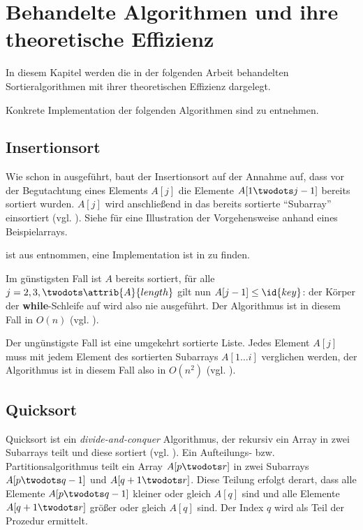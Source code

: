 \chapter{Behandelte Algorithmen und ihre theoretische Effizienz}
\label{cha:algorithmen}

In diesem Kapitel werden die in der folgenden Arbeit behandelten Sortieralgorithmen mit ihrer theoretischen Effizienz dargelegt.

Konkrete Implementation der folgenden Algorithmen sind  zu entnehmen.

\section{Insertionsort}
\label{sec:alg-insertion}

Wie schon in  ausgeführt, baut der Insertionsort auf der Annahme auf, dass vor der Begutachtung eines Elements $A[j]$ die Elemente $A[1 \twodots j - 1]$ bereits sortiert wurden. $A[j]$ wird anschließend in das bereits sortierte \enquote{Subarray} einsortiert (vgl. \cite[80]{taocp3}). Siehe  für eine Illustration der Vorgehensweise anhand eines Beispielarrays.





 ist aus \cite[18]{clrs2001} entnommen, eine Implementation ist in  zu finden.

Im günstigsten Fall ist $A$ bereits sortiert, für alle $j = 2, 3, \twodots \attrib{A}{length}$ gilt nun $A[j - 1] \leq \id{key}$: der Körper der \textbf{while}-Schleife auf  wird also nie ausgeführt. Der Algorithmus ist in diesem Fall in $O(n)$ (vgl. \cite[28]{clrs2001}).

Der ungünstigste Fall ist eine umgekehrt sortierte Liste. Jedes Element $A[j]$ muss mit jedem Element des sortierten Subarrays $A[1 \ldots i]$ verglichen werden, der Algorithmus ist in diesem Fall also in $O(n^2)$ (vgl. \cite[28f]{clrs2001}).

\section{Quicksort}
\label{sec:alg-exchanging}

Quicksort ist ein \emph{divide-and-conquer} Algorithmus, der rekursiv ein Array in zwei Subarrays teilt und diese sortiert (vgl. \cite[113f]{taocp3}). Ein Aufteilungs- bzw. Partitionsalgorithmus teilt ein Array $A[p \twodots r]$ in zwei Subarrays $A[p \twodots q-1]$ und $A[q + 1 \twodots r]$. Diese Teilung erfolgt derart, dass alle Elemente $A[p \twodots q-1]$ kleiner oder gleich $A[q]$ sind und alle Elemente $A[q+1 \twodots r]$ größer oder gleich $A[q]$ sind. Der Index $q$ wird als Teil der Prozedur ermittelt.

